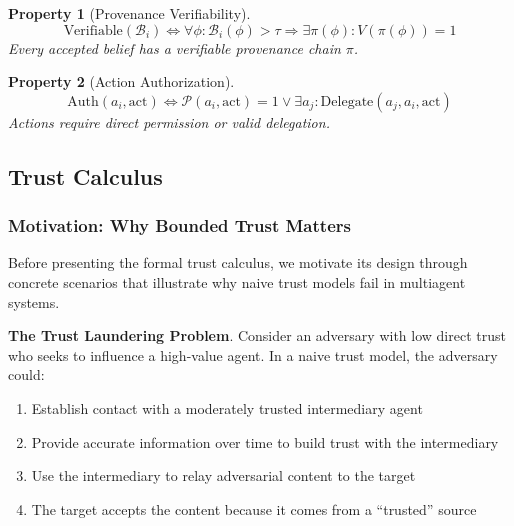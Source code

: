 \documentclass[
]{article}
\newtheorem{property}{Property}[section]
\begin{document}
\begin{property}[Provenance Verifiability]
\label{prop:provenance}
\begin{equation}
\label{eq:provenance}
\text{Verifiable}(\mathcal{B}_i) \iff \forall \phi: \mathcal{B}_i(\phi) > \tau \Rightarrow \exists \pi(\phi): V(\pi(\phi)) = 1
\end{equation}
Every accepted belief has a verifiable provenance chain $\pi$.
\end{property}

\begin{property}[Action Authorization]
\label{prop:authorization}
\begin{equation}
\label{eq:authorization}
\text{Auth}(a_i, \text{act}) \iff \mathcal{P}(a_i, \text{act}) = 1 \lor \exists a_j: \text{Delegate}(a_j, a_i, \text{act})
\end{equation}
Actions require direct permission or valid delegation.
\end{property}

\subsection{Trust Calculus}\label{sec:trust-calculus}

\subsubsection{Motivation: Why Bounded Trust
Matters}\label{sec:trust-motivation}

Before presenting the formal trust calculus, we motivate its design
through concrete scenarios that illustrate why naive trust models fail
in multiagent systems.

\textbf{The Trust Laundering Problem}. Consider an adversary with low
direct trust who seeks to influence a high-value agent. In a naive trust
model, the adversary could:

\begin{enumerate}
\item Establish contact with a moderately trusted intermediary agent
\item Provide accurate information over time to build trust with the intermediary
\item Use the intermediary to relay adversarial content to the target
\item The target accepts the content because it comes from a ``trusted'' source
\end{enumerate}
\end{document}
